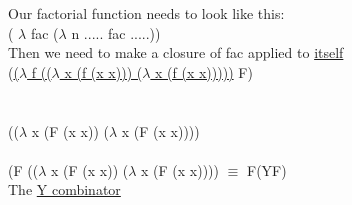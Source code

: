 \documentclass{article}
\newcommand{\tab}[1]{\hspace{0.12\textwidth}\rlap{#1}}
\begin{document}
\begin{flushleft}
\begin{flushleft}
\vspace*{1cm}
Our factorial function needs to look like this: \\
( $\lambda$ fac ($\lambda$ n ..... fac .....))\\
\vspace*{1cm}
Then we need to make a closure of fac applied to \underline{itself}\\
\vspace*{0.4cm}
(\underline{($\lambda$ f (($\lambda$ x (f (x x))) ($\lambda$ x (f (x x)))))} F)\\
\textcolor{red}{\tab{y}}\\
\bigskip
{\LARGE \tab{$\downarrow$ $\beta$}}\\
\bigskip
(($\lambda$ x (F (x x)) ($\lambda$ x (F (x x))))\\
\bigskip
{\LARGE \tab{$\downarrow$ $\beta$}}\\
\bigskip
(F (($\lambda$ x (F (x x)) ($\lambda$ x (F (x x)))) $\equiv$ F(YF)\\
\vspace*{1.5cm}
The \underline{Y combinator}  




	
\end{flushleft}
\end{flushleft}
\end{document}
